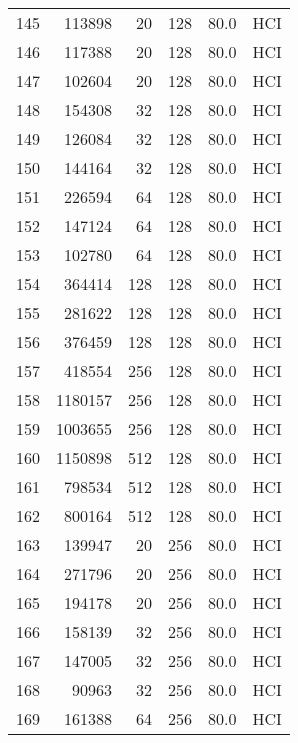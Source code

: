 \begin{longtable}{lrrrrl}
145 &    113898 &         20 &       128 &           80.0 &  HCI \\
146 &    117388 &         20 &       128 &           80.0 &  HCI \\
147 &    102604 &         20 &       128 &           80.0 &  HCI \\
148 &    154308 &         32 &       128 &           80.0 &  HCI \\
149 &    126084 &         32 &       128 &           80.0 &  HCI \\
150 &    144164 &         32 &       128 &           80.0 &  HCI \\
151 &    226594 &         64 &       128 &           80.0 &  HCI \\
152 &    147124 &         64 &       128 &           80.0 &  HCI \\
153 &    102780 &         64 &       128 &           80.0 &  HCI \\
154 &    364414 &        128 &       128 &           80.0 &  HCI \\
155 &    281622 &        128 &       128 &           80.0 &  HCI \\
156 &    376459 &        128 &       128 &           80.0 &  HCI \\
157 &    418554 &        256 &       128 &           80.0 &  HCI \\
158 &   1180157 &        256 &       128 &           80.0 &  HCI \\
159 &   1003655 &        256 &       128 &           80.0 &  HCI \\
160 &   1150898 &        512 &       128 &           80.0 &  HCI \\
161 &    798534 &        512 &       128 &           80.0 &  HCI \\
162 &    800164 &        512 &       128 &           80.0 &  HCI \\
163 &    139947 &         20 &       256 &           80.0 &  HCI \\
164 &    271796 &         20 &       256 &           80.0 &  HCI \\
165 &    194178 &         20 &       256 &           80.0 &  HCI \\
166 &    158139 &         32 &       256 &           80.0 &  HCI \\
167 &    147005 &         32 &       256 &           80.0 &  HCI \\
168 &     90963 &         32 &       256 &           80.0 &  HCI \\
169 &    161388 &         64 &       256 &           80.0 &  HCI \\

\end{longtable}
